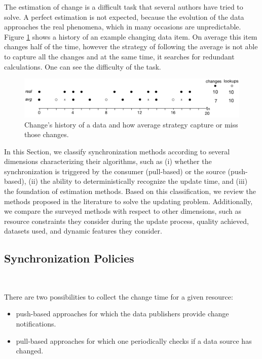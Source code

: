 \documentclass[sw]{iosart2x}
\begin{document}
The estimation of change is a difficult task that several authors have tried to solve. A perfect estimation is not expected, because the evolution of the data approaches the real phenomena, which in many occasions are unpredictable. Figure \ref{fig:syn} shows a history of an example changing data item. On average this item changes half of the time, however the strategy of following the average is not able to capture all the changes and at the same time, it searches for redundant calculations. One can see the difficulty of the task.

\begin{figure}[h]
	\centering
	\includegraphics[width=1\linewidth]{img/syn.pdf}
	\caption{Change's history of a data and how average strategy capture or miss those changes.}
	\label{fig:syn}
\end{figure}

In this Section, we classify synchronization methods according to several dimensions characterizing their algorithms, such as (i) whether the synchronization is triggered by the consumer (pull-based) or the source (push-based), (ii) the ability to deterministically recognize the update time, and (iii) the foundation of estimation methods. Based on this classification, we review the methods proposed in the literature to solve the updating problem. Additionally, we compare the surveyed methods with respect to other dimensions, such as resource constraints they consider during the update process, quality achieved, datasets used, and dynamic features they consider.

\subsection{Synchronization Policies}\label{Synchronization}
~\cite{UmbrichHHPD10}

There are two possibilities to collect the change time for a given resource:
\begin{itemize}
	\item push-based approaches for which the data publishers provide change notifications.
	\item pull-based approaches for which one periodically checks if a data source has changed.
\end{itemize}
\end{document}
